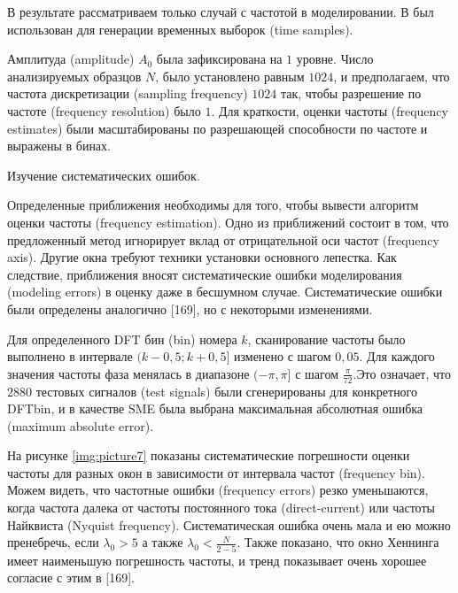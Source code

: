 В результате рассматриваем только случай с частотой в моделировании. В 
 был использован для генерации временных выборок (time samples). 

Амплитуда (amplitude) $A_0$ была зафиксирована на $1$ уровне. Число анализируемых образцов $N$, было установлено равным $1024$, и предполагаем, что частота дискретизации (sampling frequency) $1024$ так, чтобы разрешение по частоте (frequency resolution) было $1$. Для краткости, оценки частоты (frequency estimates) были масштабированы по разрешающей способности по частоте и выражены в бинах.

Изучение систематических ошибок.

Определенные приближения необходимы для того, чтобы вывести алгоритм оценки частоты (frequency estimation). Одно из приближений состоит в том, что предложенный метод игнорирует вклад от отрицательной оси частот (frequency axis).  Другие окна требуют техники установки основного лепестка. Как следствие, приближения вносят систематические ошибки моделирования (modeling errors) в оценку даже в бесшумном случае. Систематические ошибки были определены аналогично [169], но с некоторыми изменениями. 

Для определенного DFT бин (bin) номера $k$, сканирование частоты было выполнено в интервале $(k-0,5;k+ 0,5]$ изменено с шагом $0,05$. 
Для каждого значения частоты фаза менялась в диапазоне $(-\pi,\pi]$ с шагом $\frac{\pi}{72}$.Это означает, что $2880$ тестовых сигналов (test signals) были сгенерированы для конкретного DFTbin, и в качестве SME была выбрана максимальная абсолютная ошибка (maximum absolute error).

На рисунке \ref{img:picture7} показаны систематические погрешности оценки частоты для разных окон в зависимости от интервала частот (frequency bin). Можем видеть, что частотные ошибки (frequency errors) резко уменьшаются, когда частота далека от частоты постоянного тока (direct-current) или частоты Найквиста (Nyquist frequency). Систематическая ошибка очень мала и ею можно пренебречь, если $\lambda_0>5$ а также $\lambda_0< \frac{N}{2-5}$. Также показано, что окно Хеннинга имеет наименьшую погрешность частоты, и тренд показывает очень хорошее согласие с этим в [169]. 

